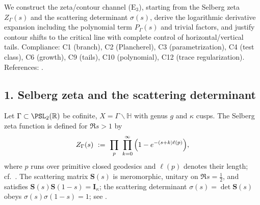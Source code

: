 \noindent
We construct the zeta/contour channel ($\mathrm{E}_3$), starting from the Selberg zeta $Z_\Gamma(s)$ and the scattering determinant $\sigma(s)$, derive the logarithmic derivative expansion including the polynomial term $P_\Gamma(s)$ and trivial factors, and justify contour shifts to the critical line with complete control of horizontal/vertical tails. \relax\hspace{0pt}
Compliance: C1 (branch), C2 (Plancherel), C3 (parametrization), C4 (test class), C6 (growth), C9 (tails), C10 (polynomial), C12 (trace regularization). \relax\hspace{0pt}
References: \cite{SelbergCollected,HejhalI,HejhalII,IwaniecSpectral,LaxPhillips,Borthwick,GuillopeZworski,ColinDeVerdiere}. %

\subsection*{1. Selberg zeta and the scattering determinant}\relax\hspace{0pt}
\label{subsec:tfc6-zeta-def} %

Let $\Gamma\subset\PSL_2(\mathbb{R})$ be cofinite, $X=\Gamma\backslash\mathbb{H}$ with genus $g$ and $\kappa$ cusps. \relax\hspace{0pt}
The Selberg zeta function is defined for $\Re s>1$ by
\begin{equation}\relax\hspace{0pt}
\label{eq:tfc6-Z-def}\relax\hspace{0pt}
Z_\Gamma(s)\ :=\ \prod_{p}\ \prod_{k=0}^{\infty}\Big(1-e^{-(s+k)\ell(p)}\Big),
\end{equation}
where $p$ runs over primitive closed geodesics and $\ell(p)$ denotes their length; cf.\ \cite{SelbergCollected,HejhalI}. \relax\hspace{0pt}
The scattering matrix $\mathbf{S}(s)$ is meromorphic, unitary on $\Re s=\tfrac12$, and satisfies $\mathbf{S}(s)\mathbf{S}(1-s)=\mathbf{I}_\kappa$; the scattering determinant $\sigma(s)=\det\mathbf{S}(s)$ obeys $\sigma(s)\sigma(1-s)=1$; see \cite{HejhalII,LaxPhillips}. \relax\hspace{0pt}

